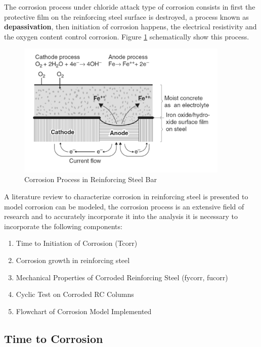The corrosion process under chloride attack type of corrosion consists in first the protective film  on the reinforcing steel surface is destroyed, a process known as \textbf{depassivation}, then initiation of corrosion happens, the electrical resistivity and the oxygen content control corrosion. Figure \ref{fig:corr1} schematically show this process.

\begin{figure}[htbp]
\centering
\includegraphics[width=0.9\textwidth]{Chapter-4/figs/Corrosion_Process}
\caption{Corrosion Process in Reinforcing Steel Bar \cite{Mehta2014}}
\label{fig:corr1}
\end{figure}


A literature review to characterize corrosion in reinforcing steel is presented to model corrosion can be modeled, the corrosion process is an extensive field of research and to accurately incorporate it into the analysis it is necessary to incorporate the following components:

\begin{enumerate}
	\item Time to Initiation of Corrosion (Tcorr)
	\item Corrosion growth in reinforcing steel
	\item Mechanical Properties of Corroded Reinforcing Steel (fycorr, fucorr)
	\item Cyclic Test on Corroded RC Columns
	\item Flowchart of Corrosion Model Implemented
\end{enumerate}

 
\subsection{Time to Corrosion}


